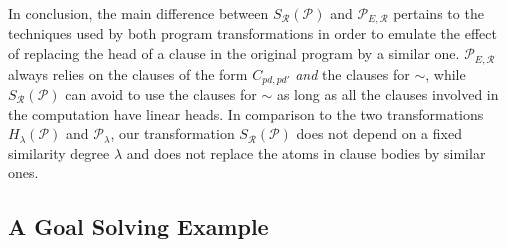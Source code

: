 \documentclass{sigplanconf}
\newcommand{\simrel}{\mathcal{R}}
\newcommand{\trans}[2]{S_{#1}(#2)}
\newcommand{\extended}[2]{H_{#1}(#2)} \newcommand{\abstracted}[2]{{#1}_{#2}}
\newcommand{\MAProg}{\mathcal{P}_{E, \simrel}}
\newcommand{\Prog}{\mathcal{P}} \newcommand{\UProg}{\mathcal{P_U}}
\theoremstyle{definition}
\theoremstyle{plain}
\begin{document}
In conclusion, the main difference between $\trans{\simrel}{\Prog}$  and $\MAProg$  pertains to the techniques used by both program transformations
in order to emulate the effect of replacing the head of a clause in the original program by a similar one. $\MAProg$ always relies on the clauses of the form $C_{pd, pd'}$ {\em and}  the clauses for $\sim$, while $\trans{\simrel}{\Prog}$ can avoid to use the clauses for $\sim$ as long as all the clauses involved in the computation have linear heads. In comparison to the two transformations $\extended{\lambda}{\Prog}$ and $\abstracted{\Prog}{\lambda}$, our transformation $\trans{\simrel}{\Prog}$ does not depend on a fixed similarity degree $\lambda$ and does not replace the atoms in clause bodies by similar ones.

\subsection{A Goal Solving Example } \label{sec:GS}
\end{document}

